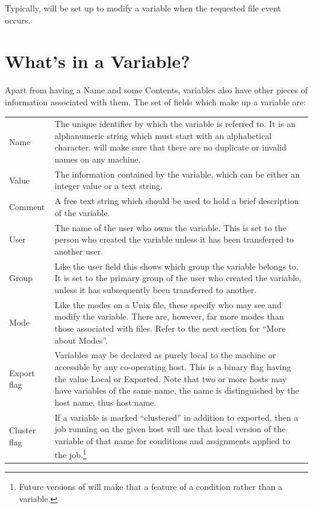 Typically,  will be set up to modify a variable when the requested file event occurs.

\section{What's in a Variable?}
Apart from having a Name and some Contents, variables also have other pieces of information associated with them. The set of fields which
make up a variable are:

\begin{tabular}{l p{13.5cm}}
Name &
The unique identifier by which the variable is referred to. It is an
alphanumeric string which must start with an alphabetical character.
\ProductName{} will make sure that there are no duplicate or invalid names on
any machine. \\
Value & The information contained by the variable, which can be either an integer value or a text string. \\
Comment & A free text string which should be used to hold a brief description of the variable. \\
User & The name of the user who owns the variable. This is set to the person who created the variable unless it has been transferred to another user. \\
Group & Like the user field this shows which group the variable belongs to. It is set to the primary group of the user who created the variable,
unless it has subsequently been transferred to another. \\
Mode &
Like the modes on a Unix file, these specify who may see and modify the variable. There are, however, far more modes than those associated with
files. Refer to the next section for ``More about Modes''. \\
Export flag &
Variables may be declared as purely local to the machine or accessible by any co-operating \ProductName{} host. This is a binary flag having the
value Local or Exported. Note that two or more hosts may have variables of the same name, the name is distinguished by the host name, thus
host:name. \\
Cluster flag & If a variable is marked ``clustered'' in addition to exported, then a job running on the given host will use
that local version of the variable of that name for conditions and assignments applied to the job.\footnote{\ProductName{} Future versions
of \ProductName{} will make that a feature of a condition rather than a variable.} \\
\end{tabular}
